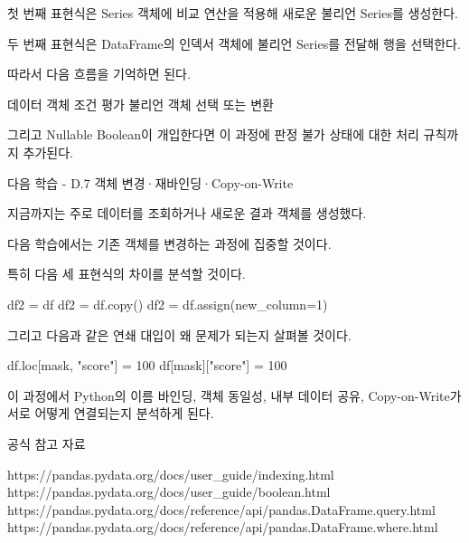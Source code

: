 첫 번째 표현식은 Series 객체에 비교 연산을 적용해 새로운 불리언 Series를 생성한다.

두 번째 표현식은 DataFrame의  인덱서 객체에 불리언 Series를 전달해 행을 선택한다.

따라서 다음 흐름을 기억하면 된다.

\begin{dhksmry}[centered]
데이터 객체 \ra 조건 평가 \ra 불리언 객체 \ra 선택 또는 변환
\end{dhksmry}

그리고 Nullable Boolean이 개입한다면 이 과정에 판정 불가 상태에 대한 처리 규칙까지 추가된다.

\begin{dhknote}
\begin{dhksmry}[centered]
다음 학습 - D.7 객체 변경·재바인딩·Copy-on-Write
\end{dhksmry}
\end{dhknote}

지금까지는 주로 데이터를 조회하거나 새로운 결과 객체를 생성했다.

다음 학습에서는 기존 객체를 변경하는 과정에 집중할 것이다.

특히 다음 세 표현식의 차이를 분석할 것이다.

\begin{dhkcode}
df2 = df
df2 = df.copy()
df2 = df.assign(new_column=1)
\end{dhkcode}

그리고 다음과 같은 연쇄 대입이 왜 문제가 되는지 살펴볼 것이다.

\begin{dhkcode}
df.loc[mask, "score"] = 100
df[mask]["score"] = 100
\end{dhkcode}

이 과정에서 Python의 이름 바인딩, 객체 동일성, 내부 데이터 공유, Copy-on-Write가 서로 어떻게 연결되는지 분석하게 된다.

공식 참고 자료

\begin{dhksmry}
https://pandas.pydata.org/docs/user_guide/indexing.html
https://pandas.pydata.org/docs/user_guide/boolean.html
https://pandas.pydata.org/docs/reference/api/pandas.DataFrame.query.html
https://pandas.pydata.org/docs/reference/api/pandas.DataFrame.where.html
\end{dhksmry}